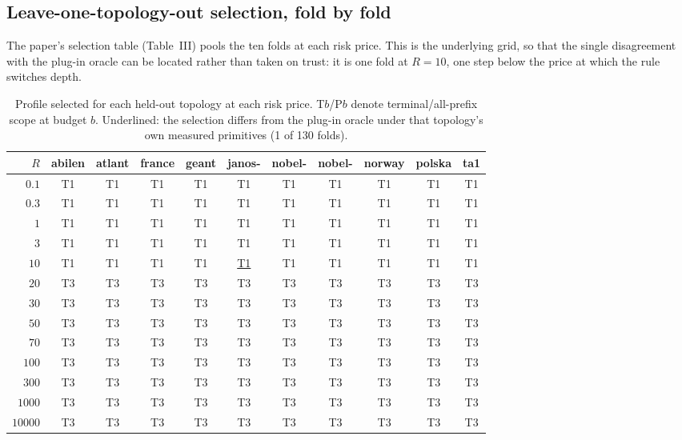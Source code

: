 \subsection{Leave-one-topology-out selection, fold by fold}
\label{supp:loto}

The paper's selection table (Table~III) pools the ten folds at each risk
price. This is the
underlying grid, so that the single disagreement with the plug-in oracle can
be located rather than taken on trust: it is one fold at $R=10$, one step
below the price at which the rule switches depth.

\begin{table}[h]
\centering
\caption{Profile selected for each held-out topology at each risk price.
T$b$/P$b$ denote terminal/all-prefix scope at budget $b$. Underlined: the
selection differs from the plug-in oracle under that topology's own measured
primitives (1 of 130 folds).}
\label{tab:supp-loto}
\footnotesize
\setlength{\tabcolsep}{4pt}
\begin{tabular}{rcccccccccc}
\toprule
$R$ & abilen & atlant & france & geant & janos- & nobel- & nobel- & norway & polska & ta1\\
\midrule
$0.1$ & T1 & T1 & T1 & T1 & T1 & T1 & T1 & T1 & T1 & T1 \\
$0.3$ & T1 & T1 & T1 & T1 & T1 & T1 & T1 & T1 & T1 & T1 \\
$1$ & T1 & T1 & T1 & T1 & T1 & T1 & T1 & T1 & T1 & T1 \\
$3$ & T1 & T1 & T1 & T1 & T1 & T1 & T1 & T1 & T1 & T1 \\
$10$ & T1 & T1 & T1 & T1 & \underline{T1} & T1 & T1 & T1 & T1 & T1 \\
$20$ & T3 & T3 & T3 & T3 & T3 & T3 & T3 & T3 & T3 & T3 \\
$30$ & T3 & T3 & T3 & T3 & T3 & T3 & T3 & T3 & T3 & T3 \\
$50$ & T3 & T3 & T3 & T3 & T3 & T3 & T3 & T3 & T3 & T3 \\
$70$ & T3 & T3 & T3 & T3 & T3 & T3 & T3 & T3 & T3 & T3 \\
$100$ & T3 & T3 & T3 & T3 & T3 & T3 & T3 & T3 & T3 & T3 \\
$300$ & T3 & T3 & T3 & T3 & T3 & T3 & T3 & T3 & T3 & T3 \\
$1000$ & T3 & T3 & T3 & T3 & T3 & T3 & T3 & T3 & T3 & T3 \\
$10000$ & T3 & T3 & T3 & T3 & T3 & T3 & T3 & T3 & T3 & T3 \\
\bottomrule
\end{tabular}
\end{table}



